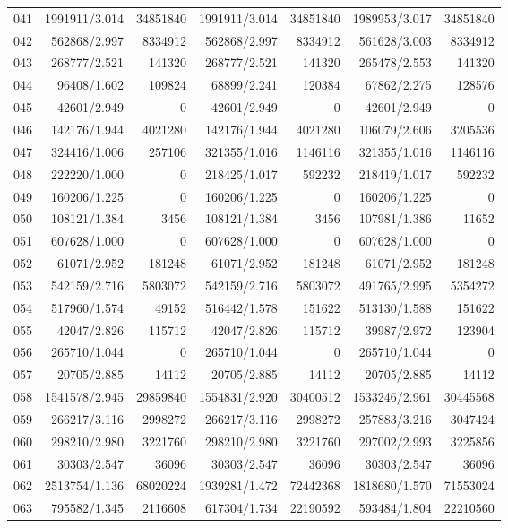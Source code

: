 \begin{longtable}{crrrrrr}
041 & 1991911/3.014 & 34851840 & 1991911/3.014 & 34851840 & 1989953/3.017 & 34851840 \\
042 & 562868/2.997 & 8334912 & 562868/2.997 & 8334912 & 561628/3.003 & 8334912 \\
043 & 268777/2.521 & 141320 & 268777/2.521 & 141320 & 265478/2.553 & 141320 \\
044 & 96408/1.602 & 109824 & 68899/2.241 & 120384 & 67862/2.275 & 128576 \\
045 & 42601/2.949 & 0 & 42601/2.949 & 0 & 42601/2.949 & 0 \\
046 & 142176/1.944 & 4021280 & 142176/1.944 & 4021280 & 106079/2.606 & 3205536 \\
047 & 324416/1.006 & 257106 & 321355/1.016 & 1146116 & 321355/1.016 & 1146116 \\
048 & 222220/1.000 & 0 & 218425/1.017 & 592232 & 218419/1.017 & 592232 \\
049 & 160206/1.225 & 0 & 160206/1.225 & 0 & 160206/1.225 & 0 \\
050 & 108121/1.384 & 3456 & 108121/1.384 & 3456 & 107981/1.386 & 11652 \\
051 & 607628/1.000 & 0 & 607628/1.000 & 0 & 607628/1.000 & 0 \\
052 & 61071/2.952 & 181248 & 61071/2.952 & 181248 & 61071/2.952 & 181248 \\
053 & 542159/2.716 & 5803072 & 542159/2.716 & 5803072 & 491765/2.995 & 5354272 \\
054 & 517960/1.574 & 49152 & 516442/1.578 & 151622 & 513130/1.588 & 151622 \\
055 & 42047/2.826 & 115712 & 42047/2.826 & 115712 & 39987/2.972 & 123904 \\
056 & 265710/1.044 & 0 & 265710/1.044 & 0 & 265710/1.044 & 0 \\
057 & 20705/2.885 & 14112 & 20705/2.885 & 14112 & 20705/2.885 & 14112 \\
058 & 1541578/2.945 & 29859840 & 1554831/2.920 & 30400512 & 1533246/2.961 & 30445568 \\
059 & 266217/3.116 & 2998272 & 266217/3.116 & 2998272 & 257883/3.216 & 3047424 \\
060 & 298210/2.980 & 3221760 & 298210/2.980 & 3221760 & 297002/2.993 & 3225856 \\
061 & 30303/2.547 & 36096 & 30303/2.547 & 36096 & 30303/2.547 & 36096 \\
062 & 2513754/1.136 & 68020224 & 1939281/1.472 & 72442368 & 1818680/1.570 & 71553024 \\
063 & 795582/1.345 & 2116608 & 617304/1.734 & 22190592 & 593484/1.804 & 22210560 \\

\end{longtable}
